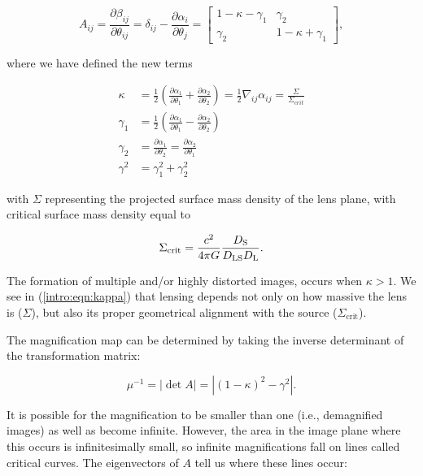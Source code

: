 \begin{equation}
A_{ij} = \frac{\partial \beta_{ij}}{\partial \theta_{ij}} = \delta_{ij} - \frac{\partial{\alpha_{i}}}{\partial{\theta_{j}}} = 
	\begin{bmatrix}
		1-\kappa-\gamma_1 & \gamma_2 \\
		\gamma_2 & 1-\kappa+\gamma_1
	\end{bmatrix},
\end{equation}

\noindent where we have defined the new terms

\begin{align}
\kappa &= \frac{1}{2} \left(\frac{\partial{\alpha_{1}}}{\partial{\theta_{1}}}+\frac{\partial{\alpha_{2}}}{\partial{\theta_{2}}}\right) = \frac{1}{2} \nabla_{ij} \alpha_{ij} = \frac{\Sigma}{\Sigma_{crit}} \label{intro:eqn:kappa} \\
\gamma_1 &= \frac{1}{2} \left(\frac{\partial{\alpha_{1}}}{\partial{\theta_{1}}}-\frac{\partial{\alpha_{2}}}{\partial{\theta_{2}}}\right) \\
\gamma_2 &= \frac{\partial{\alpha_{1}}}{\partial{\theta_{2}}} = \frac{\partial{\alpha_{2}}}{\partial{\theta_{1}}} \\
\gamma^2 &= \gamma_1^2 + \gamma_2^2
\end{align}

\noindent with $\Sigma$ representing the projected surface mass density of the lens plane, with critical surface mass density equal to

\begin{equation}
\Sigma_\mathrm{crit} = \frac{c^2}{4\pi G} \frac{D_\mathrm{S}}{D_\mathrm{LS}D_\mathrm{L}}.
\end{equation}

\noindent The formation of multiple and/or highly distorted images, occurs when $\kappa>1$. We see in (\ref{intro:eqn:kappa}) that lensing depends not only on how massive the lens is ($\Sigma$), but also its proper geometrical alignment with the source ($\Sigma_\mathrm{crit}$).

The magnification map can be determined by taking the inverse determinant of the transformation matrix:

\begin{equation}
\mu^{-1} = |\det A| = |(1-\kappa)^2 - \gamma^2|.
\end{equation}

\noindent It is possible for the magnification to be smaller than one (i.e., demagnified images) as well as become infinite. However, the area in the image plane where this occurs is infinitesimally small, so infinite magnifications fall on lines called critical curves. The eigenvectors of $A$ tell us where these lines occur:

